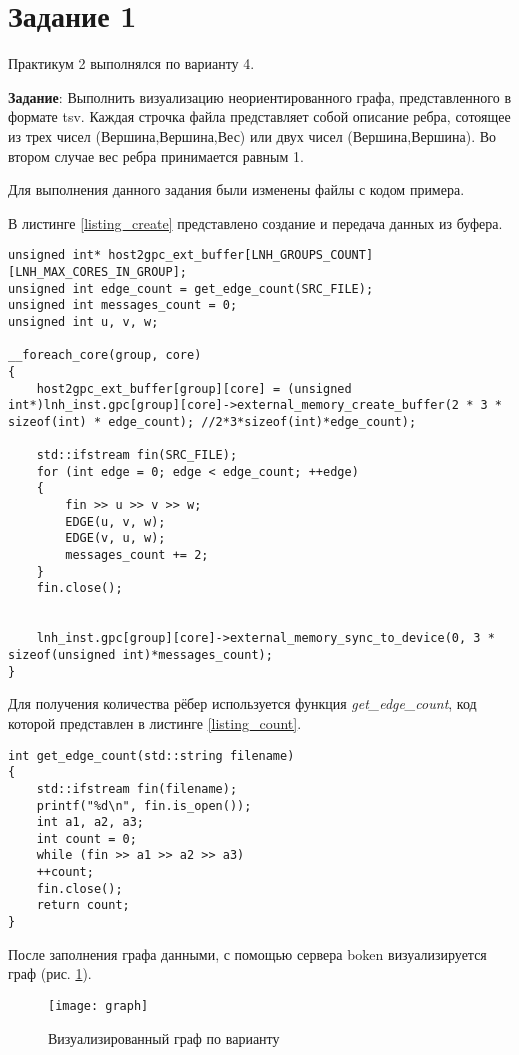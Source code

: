 \chapter*{Задание 1}

Практикум 2 выполнялся по варианту 4.

\textbf{Задание}: Выполнить визуализацию неориентированного графа, представленного в формате tsv. 
Каждая строчка файла представляет собой описание ребра, сотоящее из трех чисел (Вершина,Вершина,Вес) или двух чисел (Вершина,Вершина). 
Во втором случае вес ребра принимается равным 1.

Для выполнения данного задания были изменены файлы с кодом примера.

В листинге \ref{listing_create} представлено создание и передача данных из буфера.

\begin{center}
	\begin{lstlisting}[label=listing_create,caption=Создание и передача данных из буфера]
unsigned int* host2gpc_ext_buffer[LNH_GROUPS_COUNT][LNH_MAX_CORES_IN_GROUP];
unsigned int edge_count = get_edge_count(SRC_FILE);
unsigned int messages_count = 0;
unsigned int u, v, w;

__foreach_core(group, core)
{
	host2gpc_ext_buffer[group][core] = (unsigned int*)lnh_inst.gpc[group][core]->external_memory_create_buffer(2 * 3 * sizeof(int) * edge_count); //2*3*sizeof(int)*edge_count);
	
	std::ifstream fin(SRC_FILE);
	for (int edge = 0; edge < edge_count; ++edge) 
	{
		fin >> u >> v >> w;
		EDGE(u, v, w);
		EDGE(v, u, w);
		messages_count += 2;
	}
	fin.close();
	
	
	lnh_inst.gpc[group][core]->external_memory_sync_to_device(0, 3 * sizeof(unsigned int)*messages_count);
}
	\end{lstlisting}
\end{center}

Для получения количества рёбер используется функция \textit{get\_edge\_count}, код которой представлен в листинге \ref{listing_count}.

\begin{center}
	\begin{lstlisting}[label=listing_count,caption=Создание и передача данных из буфера]
int get_edge_count(std::string filename)
{
	std::ifstream fin(filename);
	printf("%d\n", fin.is_open());
	int a1, a2, a3;
	int count = 0;
	while (fin >> a1 >> a2 >> a3)
	++count;
	fin.close();
	return count;
}		
	\end{lstlisting}
\end{center}

После заполнения графа данными, с помощью сервера boken визуализируется граф (рис. \ref{graph}).

\begin{figure}[ht!]\centering
	\texttt{[image: graph]}
	\caption{Визуализированный граф по варианту}
	\label{graph}
\end{figure}
